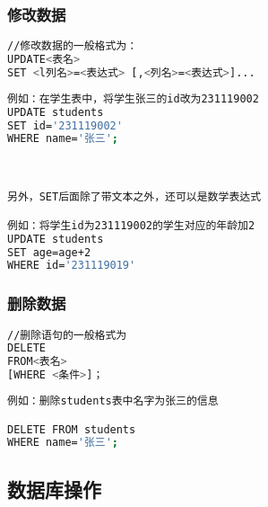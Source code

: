 \subsubsection{修改数据}
\begin{lstlisting}[language=bash]
//修改数据的一般格式为：
UPDATE<表名>
SET <l列名>=<表达式> [,<列名>=<表达式>]...
\end{lstlisting}

\begin{lstlisting}[language=bash]
例如：在学生表中，将学生张三的id改为231119002
UPDATE students 
SET id='231119002'
WHERE name='张三';



另外，SET后面除了带文本之外，还可以是数学表达式

例如：将学生id为231119002的学生对应的年龄加2
UPDATE students 
SET age=age+2
WHERE id='231119019'
\end{lstlisting}
\subsubsection{删除数据}

\begin{lstlisting}[language=bash]
//删除语句的一般格式为
DELETE
FROM<表名>
[WHERE <条件>]；
\end{lstlisting}

\begin{lstlisting}[language=bash]
例如：删除students表中名字为张三的信息

DELETE FROM students 
WHERE name='张三';
\end{lstlisting}


\subsection{数据库操作}
